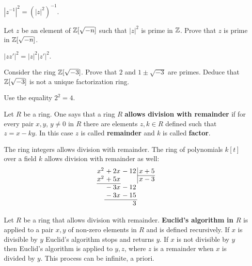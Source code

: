 \documentclass[12pt]{article}
\begin{document}
\begin{ukazanie} $|z^{-1}|^2 = (|z|^2)^{-1}$.
\end{ukazanie}

\begin{zadacha}\label{prime.gauss} 
Let $z$ be an element of ${\mathbb Z}[\sqrt{-n}]$ such that $|z|^2$ is prime in
${\mathbb Z}$. Prove that $z$ is prime in ${\mathbb Z}[\sqrt{-n}]$.
\end{zadacha}

\begin{ukazanie} $|z z'|^2 = |z|^2 |z'|^2$.
\end{ukazanie}

\begin{zadacha}[!] Consider the ring ${\mathbb Z}[\sqrt{-3}]$.
Prove that $2$ and $1\pm \sqrt{-3}$ are primes. Deduce that
${\mathbb Z}[\sqrt{-3}]$ is not a unique factorization ring.
\end{zadacha}

\begin{ukazanie} Use the equality $2^2 =4$.
\end{ukazanie}


\begin{opredelenie} Let $R$ be a ring.
One says that a ring $R$   {\bf allows division with remainder}  if 
for every pair $x, y$, $y\neq 0$ in $R$ there are elements  $z, k\in
R$ defined such that $z = x - ky$. In this case $z$ is called 
{\bf remainder} and $k$ is called {\bf factor}.
\end{opredelenie}

 The ring integers allows division with
remainder.  The ring of polynomials $k[t]$ over a field $k$ allows
division with remainder as well:
$$
\arraycolsep=0.05em
\begin{array}{rrr@{\,}r|r}
x^2&{}+2x&{}-12&&\,x+5\\
\cline{5-5}
x^2&{}+5x&&&\,x-3\\
\cline{1-2}
&{}-3x&{}-12\\
&{}-3x&{}-15\\
\cline{2-3}
&&3
\end{array}
$$

\begin{opredelenie} Let $R$ be a ring that allows division with
  remainder. {\bf Euclid's algorithm in $R$} is applied to a pair $x,
  y$ of non-zero elements in $R$ and is defined recursively. If $x$ is
  divisible by $y$ Euclid's algorithm stops and returns $y$.  If $x$
  is not divisible by $y$ then Euclid's algorithm is applied to $y,
  z$, where $z$ is a remainder when $x$ is divided by $y$. This
  process can be infinite, a priori.
\end{opredelenie}
\end{document}
